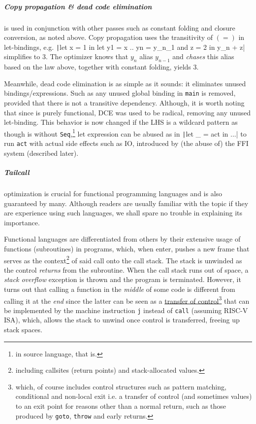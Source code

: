 \documentclass[a4paper, 11pt]{article}
\theoremstyle{remark}\newtheorem*{remark}{Remark}
\theoremstyle{definition}\newtheorem*{definition}{Definition}
\begin{document}
\subparagraph{Copy propagation \& dead code elimination} is used in conjunction with other passes such as
constant folding and closure conversion, as noted above. Copy propagation uses the transitivity of $(=)$ in let-bindings,
e.g. \texttt|let x = 1 in let y1 = x .. yn = y_n_1 and z = 2 in y_n + z| simplifies to $3$. The optimizer knows that $y_n$ alias $y_{n-1}$ and \emph{chases} this alias based on the law above, together with constant folding,
yields $3$.

Meanwhile, dead code elimination is as simple as it sounds: it eliminates unused bindings/expressions.
Such as any unused global binding in \texttt{main} is removed, provided that there is not a transitive dependency.
Although, it is worth noting that since \Tigris is purely functional, DCE was used to be radical, removing any unused
let-binding. This behavior is now changed if the LHS is a wildcard pattern as though \Tigris is without
\texttt{Seq},\footnote{in source language, that is.} let expression can be abused
as in \texttt|let _ = act in ...| to run
\texttt{act} with actual side effects such as IO, introduced by (the abuse of) the FFI system (described later).

\subparagraph{Tailcall} optimization is crucial for functional programming languages and is also
guaranteed by many. Although readers are usually familiar with the topic if they are experience using such languages,
we shall spare no trouble in explaining its importance.

Functional languages are differentiated from others by their extensive usage of functions (subroutines) in programs, which,
when enter, pushes a new frame that serves as the context\footnote{
including callsites (return points) and stack-allocated values.
}
of said call onto the call stack.
The stack is unwinded as the control \emph{returns} from the subroutine.
When the call stack runs out of space, a \emph{stack overflow} exception is thrown and the program is terminated.
However, it turns out that calling a function in the \emph{middle} of some code is different from calling it
at the \emph{end} since the latter can be seen as a \underline{transfer of control}\footnote{
which, of course includes control structures such as pattern matching, conditional and
non-local exit i.e. a transfer of control (and sometimes values) to an exit point for reasons other than a normal return, such as those produced by \texttt{goto}, \texttt{throw} and early returns.
}
that can be implemented by the machine
instruction \texttt{j} instead of \texttt{call} (assuming RISC-V ISA), which, allows the stack to unwind once
control is transferred, freeing up stack spaces.
\end{document}
